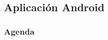 
\subsection{Aplicación Android}

\watermarkon
\begin{frame}
	\frametitle{Agenda}
	
\end{frame}
\watermarkoff

